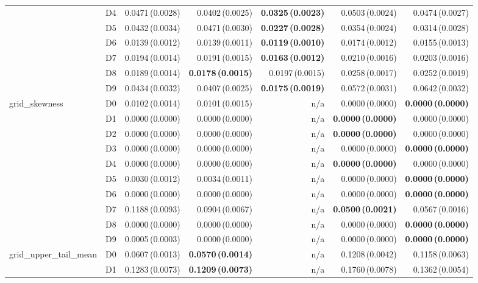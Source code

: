 \begin{table}[htbp]
\begin{tabular}{@{}llrrrrr@{}}
 & D4 & 0.0471\,(0.0028) & 0.0402\,(0.0025) & \textbf{0.0325\,(0.0023)} & 0.0503\,(0.0024) & 0.0474\,(0.0027) \\
 & D5 & 0.0432\,(0.0034) & 0.0471\,(0.0030) & \textbf{0.0227\,(0.0028)} & 0.0354\,(0.0024) & 0.0314\,(0.0028) \\
 & D6 & 0.0139\,(0.0012) & 0.0139\,(0.0011) & \textbf{0.0119\,(0.0010)} & 0.0174\,(0.0012) & 0.0155\,(0.0013) \\
 & D7 & 0.0194\,(0.0014) & 0.0191\,(0.0015) & \textbf{0.0163\,(0.0012)} & 0.0210\,(0.0016) & 0.0203\,(0.0016) \\
 & D8 & 0.0189\,(0.0014) & \textbf{0.0178\,(0.0015)} & 0.0197\,(0.0015) & 0.0258\,(0.0017) & 0.0252\,(0.0019) \\
 & D9 & 0.0434\,(0.0032) & 0.0407\,(0.0025) & \textbf{0.0175\,(0.0019)} & 0.0572\,(0.0031) & 0.0642\,(0.0032) \\
\midrule
grid\_skewness & D0 & 0.0102\,(0.0014) & 0.0101\,(0.0015) & n/a & 0.0000\,(0.0000) & \textbf{0.0000\,(0.0000)} \\
 & D1 & 0.0000\,(0.0000) & 0.0000\,(0.0000) & n/a & \textbf{0.0000\,(0.0000)} & 0.0000\,(0.0000) \\
 & D2 & 0.0000\,(0.0000) & 0.0000\,(0.0000) & n/a & \textbf{0.0000\,(0.0000)} & 0.0000\,(0.0000) \\
 & D3 & 0.0000\,(0.0000) & 0.0000\,(0.0000) & n/a & 0.0000\,(0.0000) & \textbf{0.0000\,(0.0000)} \\
 & D4 & 0.0000\,(0.0000) & 0.0000\,(0.0000) & n/a & \textbf{0.0000\,(0.0000)} & 0.0000\,(0.0000) \\
 & D5 & 0.0030\,(0.0012) & 0.0034\,(0.0011) & n/a & 0.0000\,(0.0000) & \textbf{0.0000\,(0.0000)} \\
 & D6 & 0.0000\,(0.0000) & 0.0000\,(0.0000) & n/a & 0.0000\,(0.0000) & \textbf{0.0000\,(0.0000)} \\
 & D7 & 0.1188\,(0.0093) & 0.0904\,(0.0067) & n/a & \textbf{0.0500\,(0.0021)} & 0.0567\,(0.0016) \\
 & D8 & 0.0000\,(0.0000) & 0.0000\,(0.0000) & n/a & 0.0000\,(0.0000) & \textbf{0.0000\,(0.0000)} \\
 & D9 & 0.0005\,(0.0003) & 0.0000\,(0.0000) & n/a & 0.0000\,(0.0000) & \textbf{0.0000\,(0.0000)} \\
\midrule
grid\_upper\_tail\_mean & D0 & 0.0607\,(0.0013) & \textbf{0.0570\,(0.0014)} & n/a & 0.1208\,(0.0042) & 0.1158\,(0.0063) \\
 & D1 & 0.1283\,(0.0073) & \textbf{0.1209\,(0.0073)} & n/a & 0.1760\,(0.0078) & 0.1362\,(0.0054) \\

\end{tabular}
\end{table}
